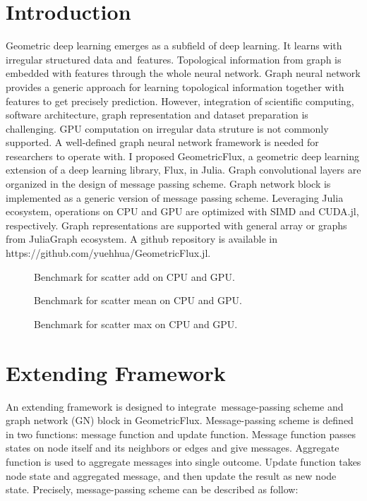 \documentclass{juliacon}
\begin{document}
\section{Introduction}

Geometric deep learning emerges as a subfield of deep learning. It learns with irregular
structured data and features. Topological information from graph is embedded with features
through the whole neural network. Graph neural network provides a generic approach \cite{gilmer2017,battaglia2018}
for learning topological information together with features to get precisely prediction.
However, integration of scientific computing, software architecture, graph representation
and dataset preparation is challenging. GPU computation on irregular data struture is not
commonly supported. A well-defined graph neural network framework is needed for researchers
to operate with. I proposed GeometricFlux, a geometric deep learning extension of a deep learning
library, Flux, in Julia. Graph convolutional layers are organized in the design of message
passing scheme. Graph network block is implemented as a generic version of message passing
scheme. Leveraging Julia ecosystem, operations on CPU and GPU are optimized with SIMD and
CUDA.jl, respectively. Graph representations are supported with general array or graphs from
JuliaGraph ecosystem.
A github repository is available in https://github.com/yuehhua/GeometricFlux.jl.

\begin{figure*}[t]
\resizebox{180mm}{!}{}
\caption{Benchmark for scatter add on CPU and GPU.}
\label{fig:scatter_add}
\end{figure*}

\begin{figure*}[ht]
\resizebox{180mm}{!}{}
\caption{Benchmark for scatter mean on CPU and GPU.}
\label{fig:scatter_mean}
\end{figure*}

\begin{figure*}[ht]
\resizebox{180mm}{!}{}
\caption{Benchmark for scatter max on CPU and GPU.}
\label{fig:scatter_max}
\end{figure*}

\section{Extending Framework}

An extending framework is designed to integrate message-passing scheme and graph network (GN)
block in GeometricFlux. Message-passing scheme is defined in two functions: message function
and update function. Message function passes states on node itself and its neighbors or edges
and give messages. Aggregate function is used to aggregate messages into single outcome.
Update function takes node state and aggregated message, and then update the result as new
node state. Precisely, message-passing scheme can be described as follow:
\end{document}
